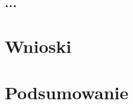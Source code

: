 \documentclass[en, noamssymb]{mgr}
\begin{document}
\section{...}

\chapter{Wnioski} \label{sec:sekcjaWnioski}

\chapter{Podsumowanie}
\label{sec:Podsumowanie}

\end{document}
